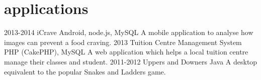 \documentclass[]{friggeri-cv}
\begin{document}
\section{applications}

\begin{entrylist}
  \entry
    {2013-2014}
    {iCrave}
    {Android, node.js, MySQL}
    {A mobile application to analyse how images can prevent a food craving.}
  \entry
    {2013}
    {Tuition Centre Management System}
    {PHP (CakePHP), MySQL}
    {A web application which helps a local tuition centre manage their classes and student.}
  \entry
    {2011-2012}
    {Uppers and Downers}
    {Java}
    {A desktop equivalent to the popular Snakes and Ladders game.}
\end{entrylist}



% 
\end{document}
